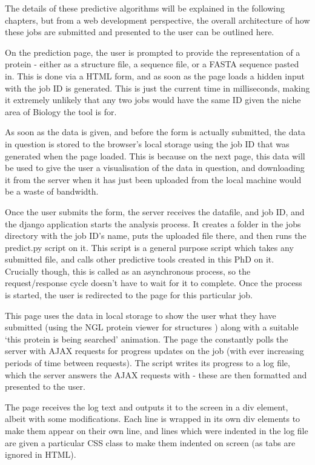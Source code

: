 The details of these predictive algorithms will be explained in the following chapters, but from a web development perspective, the overall architecture of how these jobs are submitted and presented to the user can be outlined here.

On the prediction page, the user is prompted to provide the representation of a protein - either as a structure file, a sequence file, or a FASTA sequence pasted in. This is done via a HTML form, and as soon as the page loads a hidden input with the job ID is generated. This is just the current time in milliseconds, making it extremely unlikely that any two jobs would have the same ID given the niche area of Biology the tool is for.

As soon as the data is given, and before the form is actually submitted, the data in question is stored to the browser's local storage using the job ID that was generated when the page loaded. This is because on the next page, this data will be used to give the user a visualisation of the data in question, and downloading it from the server when it has just been uploaded from the local machine would be a waste of bandwidth.

Once the user submits the form, the server receives the datafile, and job ID, and the django application starts the analysis process. It creates a folder in the jobs directory with the job ID's name, puts the uploaded file there, and then runs the predict.py script on it. This script is a general purpose script which takes any submitted file, and calls other predictive tools created in this PhD on it. Crucially though, this is called as an asynchronous process, so the request/response cycle doesn't have to wait for it to complete. Once the process is started, the user is redirected to the page for this particular job.

This page uses the data in local storage to show the user what they have submitted (using the NGL protein viewer for structures ) along with a suitable `this protein is being searched' animation. The page the constantly polls the server with AJAX requests for progress updates on the job (with ever increasing periods of time between requests). The script writes its progress to a log file, which the server answers the AJAX requests with - these are then formatted and presented to the user.

The page receives the log text and outputs it to the screen in a div element, albeit with some modifications. Each line is wrapped in its own div elements to make them appear on their own line, and lines which were indented in the log file are given a particular CSS class to make them indented on screen (as tabs are ignored in HTML).

